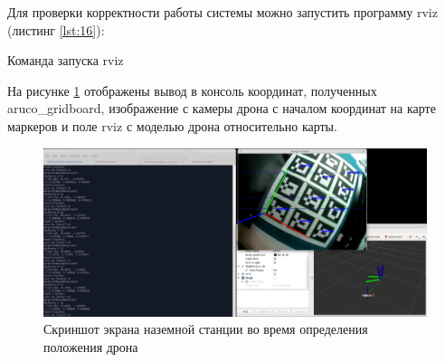 Для проверки корректности работы системы можно запустить программу rviz (листинг \ref{lst:16}):
\begin{Program}[H]
\caption{Команда запуска rviz} \label{lst:16}
\end{Program}
На рисунке \ref{fig:px4} отображены вывод в консоль координат, полученных aruco\_g\-rid\-board, изображение с камеры дрона с началом координат на карте маркеров и поле rviz с моделью дрона относительно карты.
\begin{figure}[H]
	\centering
	\includegraphics[width=0.9\linewidth]{pics/px4}
	\caption{ Скриншот экрана наземной станции во время определения положения дрона
	}
	\label{fig:px4}
\end{figure}
